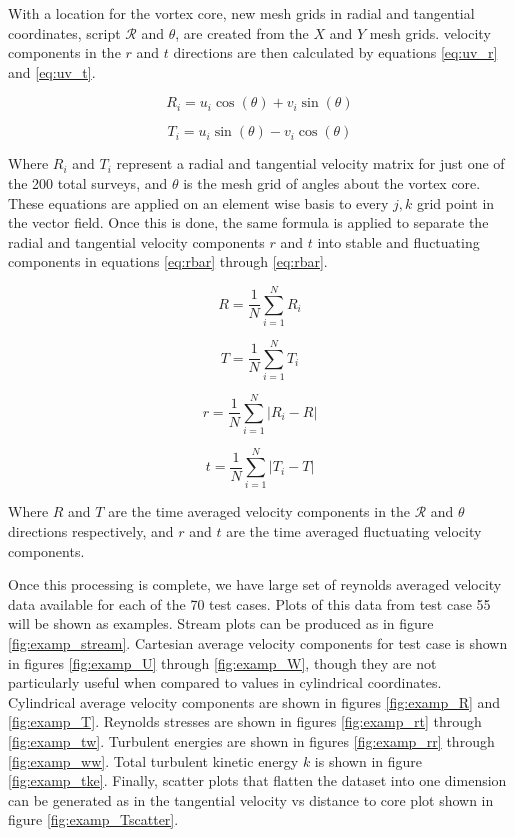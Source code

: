 With a location for the vortex core, new mesh grids in radial and tangential 
coordinates, script $\mathcal{R}$ and $\theta$, are created from the $X$ and 
$Y$ mesh grids. velocity components in the $r$ and $t$ directions are then 
calculated by equations \ref{eq:uv_r} and \ref{eq:uv_t}.

\begin{equation}
R_i = u_i \cos{(\theta)} + v_i \sin{(\theta)}
\label{eq:uv_r}
\end{equation}

\begin{equation}
T_i = u_i \sin{(\theta)} - v_i \cos{(\theta)}
\label{eq:uv_t}
\end{equation}

Where $R_i$ and $T_i$ represent a radial and tangential velocity matrix for 
just one of the 200 total surveys, and $\theta$ is the mesh grid of angles 
about the vortex core. These equations are applied on an element wise basis to 
every $j,k$ grid point in the vector field. Once this is done, the same formula 
is applied to separate the radial and tangential velocity components $r$ and 
$t$ into stable and fluctuating components in equations \ref{eq:rbar} through 
\ref{eq:rbar}.

\begin{equation}
R  = \frac{1}{N} \sum_{i=1}^N R_i
\label{eq:rbar}
\end{equation}

\begin{equation}
T  = \frac{1}{N} \sum_{i=1}^N T_i
\label{eq:tbar}
\end{equation}

\begin{equation}
r = \frac{1}{N} \sum_{i=1}^N |R_i - R|
\end{equation}

\begin{equation}
t = \frac{1}{N} \sum_{i=1}^N |T_i - T|
\end{equation}

Where $R$ and $T$ are the time averaged velocity 
components in the $\mathcal{R}$ and $\theta$ directions respectively, and  $r$
and $t$ are the time averaged fluctuating velocity components.

Once this processing is complete, we have large set of reynolds averaged 
velocity data available for each of the 70 test cases. Plots of this data from 
test case 55 will be shown as examples. Stream plots can be produced as in 
figure \ref{fig:examp_stream}. Cartesian average velocity components for test 
case is shown in figures \ref{fig:examp_U} through \ref{fig:examp_W}, though 
they are not particularly useful when compared to values in cylindrical 
coordinates. 
Cylindrical average velocity components are shown in figures \ref{fig:examp_R} 
and \ref{fig:examp_T}. Reynolds stresses are shown in figures 
\ref{fig:examp_rt} through \ref{fig:examp_tw}. Turbulent energies are shown in 
figures \ref{fig:examp_rr} through \ref{fig:examp_ww}. Total turbulent kinetic 
energy $k$ is shown in figure \ref{fig:examp_tke}. Finally, scatter plots that 
flatten the dataset into one dimension can be generated as in the tangential 
velocity vs distance to core plot shown in figure \ref{fig:examp_Tscatter}.


